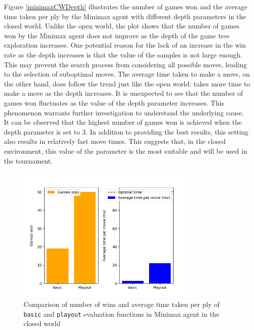 Figure \ref{minimaxCWDepth} illustrates the number of games won and the average time taken per ply by the Minimax agent with different depth parameters in the closed world. Unlike the open world, the plot shows that the number of games won by the Minimax agent does not improve as the depth of the game tree exploration increases. One potential reason for the lack of an increase in the win rate as the depth increases is that the value of the samples is not large enough. This may prevent the search process from considering all possible moves, leading to the selection of suboptimal moves. The average time taken to make a move, on the other hand, does follow the trend just like the open world: takes more time to make a move as the depth increases. It is unexpected to see that the number of games won fluctuates as the value of the depth parameter increases. This phenomenon warrants further investigation to understand the underlying cause. It can be observed that the highest number of games won is achieved when the depth parameter is set to 3. In addition to providing the best results, this setting also results in relatively fast move times. This suggests that, in the closed environment, this value of the parameter is the most suitable and will be used in the tournament.

\begin{figure}[h]
  \centering
  \captionsetup{justification=centering}
  \includegraphics[width=0.8\textwidth]{../img/minimax_eval_closedworld.png}
  \caption{Comparison of number of wins and average time taken per ply of \texttt{basic} and \texttt{playout} evaluation functions in Minimax agent in the closed world}
  \label{minimaxCWEval}
\end{figure}

